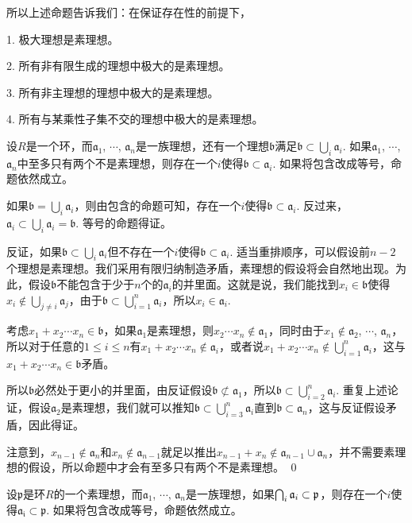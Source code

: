 所以上述命题告诉我们：在保证存在性的前提下，

	1. 极大理想是素理想。

	2. 所有非有限生成的理想中极大的是素理想。

	3. 所有非主理想的理想中极大的是素理想。

	4. 所有与某乘性子集不交的理想中极大的是素理想。

\pro \label{primeav}设$R$是一个环，而$\mathfrak{a}_1$, $\cdots$, $\mathfrak{a}_n$是一族理想，还有一个理想$\mathfrak{b}$满足$\mathfrak{b}\subset \bigcup_i \mathfrak{a}_i$. 如果$\mathfrak{a}_1$, $\cdots$, $\mathfrak{a}_n$中至多只有两个不是素理想，则存在一个$i$使得$\mathfrak{b}\subset \mathfrak{a}_i$. 如果将包含改成等号，命题依然成立。

\proof
	如果$\mathfrak{b}=\bigcup_i \mathfrak{a}_i$，则由包含的命题可知，存在一个$i$使得$\mathfrak{b}\subset \mathfrak{a}_i$. 反过来，$\mathfrak{a}_i\subset \bigcup_i \mathfrak{a}_i=\mathfrak{b}$. 等号的命题得证。

	反证，如果$\mathfrak{b}\subset \bigcup_i \mathfrak{a}_i$但不存在一个$i$使得$\mathfrak{b}\subset \mathfrak{a}_i$. 适当重排顺序，可以假设前$n-2$个理想是素理想。我们采用有限归纳制造矛盾，素理想的假设将会自然地出现。为此，假设$\mathfrak{b}$不能包含于少于$n$个的$\mathfrak{a}_i$的并里面。这就是说，我们能找到$x_i\in \mathfrak{b}$使得$x_i\not\in \bigcup_{j\neq i}\mathfrak{a}_j$，由于$\mathfrak{b}\subset \bigcup_{i=1}^n \mathfrak{a}_i$，所以$x_i\in \mathfrak{a}_i$.

	考虑$x_1+x_2\cdots x_n\in \mathfrak{b}$，如果$\mathfrak{a}_1$是素理想，则$x_2\cdots x_n\not\in \mathfrak{a}_1$，同时由于$x_1\not\in \mathfrak{a}_2$, $\cdots$, $\mathfrak{a}_n$，所以对于任意的$1\leq i \leq n$有$x_1+x_2\cdots x_n\not\in \mathfrak{a}_i$，或者说$x_1+x_2\cdots x_n\not\in \bigcup_{i=1}^n \mathfrak{a}_i$，这与$x_1+x_2\cdots x_n\in \mathfrak{b}$矛盾。

	所以$\mathfrak{b}$必然处于更小的并里面，由反证假设$\mathfrak{b}\not\subset \mathfrak{a}_1$，所以$\mathfrak{b}\subset \bigcup_{i=2}^n \mathfrak{a}_i$. 重复上述论证，假设$\mathfrak{a}_2$是素理想，我们就可以推知$\mathfrak{b}\subset \bigcup_{i=3}^n \mathfrak{a}_i$直到$\mathfrak{b}\subset \mathfrak{a}_n$，这与反证假设矛盾，因此得证。 

	注意到，$x_{n-1}\not\in \mathfrak{a}_n$和$x_{n}\not\in \mathfrak{a}_{n-1}$就足以推出$x_{n-1}+x_{n}\not\in \mathfrak{a}_{n-1}\cup \mathfrak{a}_n$，并不需要素理想的假设，所以命题中才会有至多只有两个不是素理想。
\qed

\pro \label{primeau}设$\mathfrak{p}$是环$R$的一个素理想，而$\mathfrak{a}_1$, $\cdots$, $\mathfrak{a}_n$是一族理想，如果$\bigcap_i \mathfrak{a}_i\subset \mathfrak{p}$，则存在一个$i$使得$\mathfrak{a_i}\subset \mathfrak{p}$. 如果将包含改成等号，命题依然成立。


